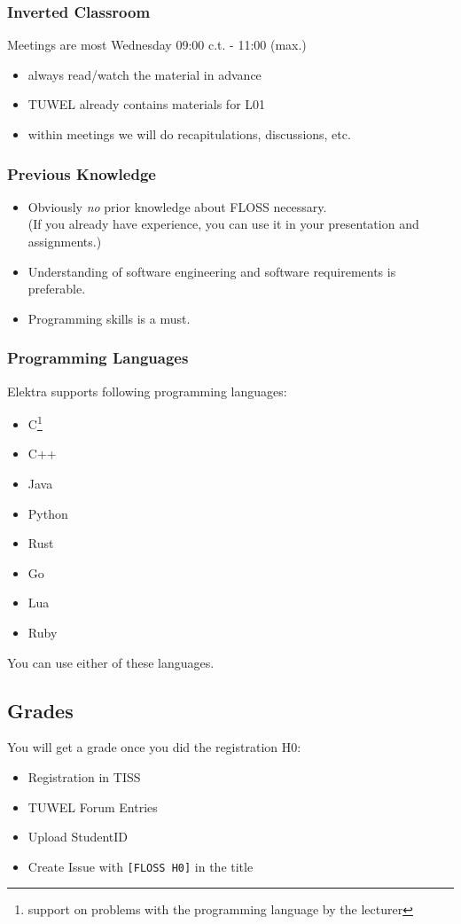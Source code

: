 \begin{frame}
	\frametitle{Inverted Classroom}
	Meetings are most Wednesday 09:00 c.t. - 11:00 (max.)

	\begin{itemize}
		\item always read/watch the material in advance
		\item TUWEL already contains materials for L01
		\item within meetings we will do recapitulations, discussions, etc.
	\end{itemize}
\end{frame}

\begin{frame}
	\frametitle{Previous Knowledge}
	\begin{itemize}
		\item Obviously \textit{no} prior knowledge about FLOSS necessary. \\
		(If you already have experience, you can use it in your presentation and assignments.)
		\item Understanding of software engineering and software requirements is preferable.
		\item Programming skills is a must.
	\end{itemize}
\end{frame}

\begin{frame}
	\frametitle{Programming Languages}
	Elektra supports following programming languages:
	\begin{itemize}
		\item C\footnote{support on problems with the programming language by the lecturer}
		\item C++\footnotemark[1]
		\item Java\footnotemark[1]
		\item Python\footnotemark[1]
		\item Rust
		\item Go
		\item Lua
		\item Ruby
	\end{itemize}
	You can use either of these languages.
\end{frame}

\subsection{Grades}

\begin{frame}[fragile]
	You will get a grade once you did the registration H0:
	\begin{itemize}
	\item Registration in TISS
	\item TUWEL Forum Entries
	\item Upload StudentID
	\item Create Issue with \verb+[FLOSS H0]+ in the title
	\end{itemize}
\end{frame}


